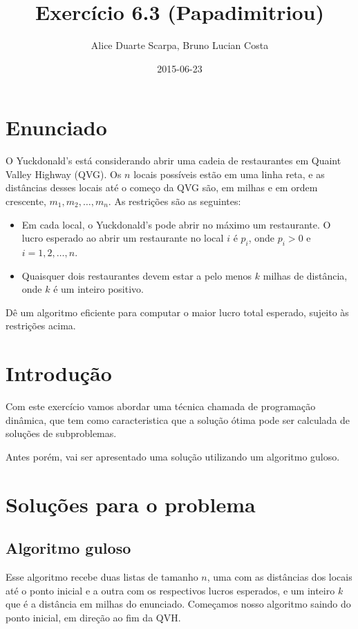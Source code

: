 \documentclass[11pt]{article}
\author{Alice Duarte Scarpa, Bruno Lucian Costa}
\date{2015-06-23}
\title{Exercício 6.3 (Papadimitriou)}
\begin{document}
\maketitle

\section{Enunciado}
\label{sec-1}

O Yuckdonald's está considerando abrir uma cadeia de restaurantes em
Quaint Valley Highway (QVG). Os $n$ locais possíveis estão em uma
linha reta, e as distâncias desses locais até o começo da QVG são, em
milhas e em ordem crescente, $m_1, m_2, \ldots, m_n$. As restrições
são as seguintes:

\begin{itemize}
\item Em cada local, o Yuckdonald's pode abrir no máximo um
restaurante. O lucro esperado ao abrir um restaurante no local
$i$ é $p_i$, onde $p_i > 0$ e $i = 1, 2, \ldots, n$.
\item Quaisquer dois restaurantes devem estar a pelo menos $k$
  milhas de distância, onde $k$ é um inteiro positivo.
\end{itemize}

Dê um algoritmo eficiente para computar o maior lucro total
esperado, sujeito às restrições acima.

\section{Introdução}
\label{sec-2}
\label{sec-2}

Com este exercício vamos abordar uma técnica chamada de programação
dinâmica, que tem como caracteristica que a solução ótima pode ser
calculada de soluções de subproblemas.

Antes porém, vai ser apresentado uma solução utilizando um algoritmo guloso.


\section{Soluções para o problema}
\label{sec-3}
\label{sec-3}

\subsection{Algoritmo guloso}
\label{sec-3-1}

\label{sec-3-3}

Esse algoritmo recebe duas listas de tamanho $n$, uma com as distâncias
dos locais até o ponto inicial e a outra com os respectivos lucros
esperados, e um inteiro $k$ que é a distância em milhas do enunciado.
Começamos nosso algoritmo saindo do ponto inicial, em direção ao fim
da QVH.
\end{document}
